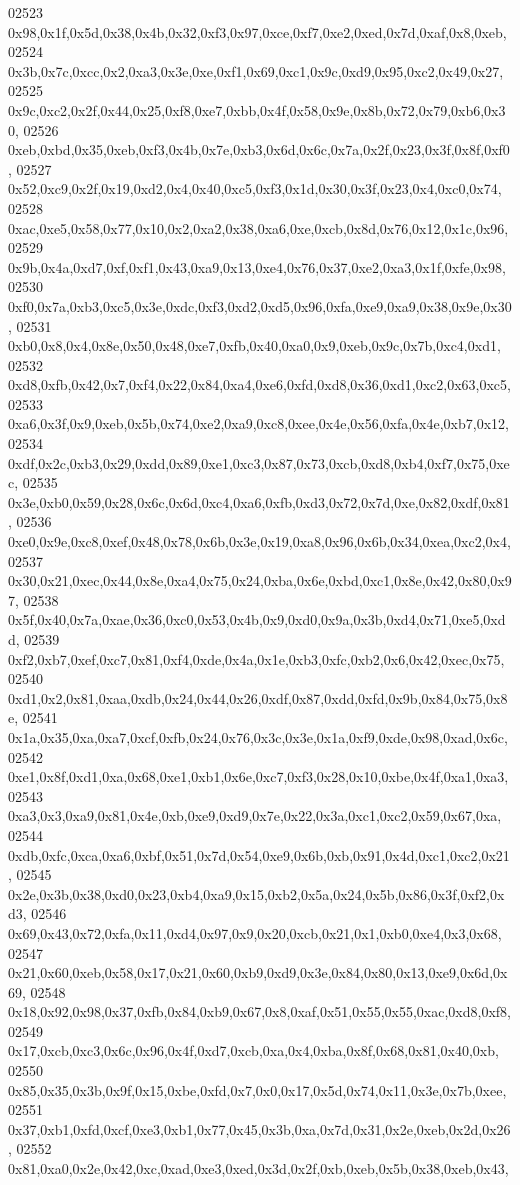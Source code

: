 \begin{DoxyCode}
02523   0x98,0x1f,0x5d,0x38,0x4b,0x32,0xf3,0x97,0xce,0xf7,0xe2,0xed,0x7d,0xaf,0x8,0xeb,
02524   0x3b,0x7c,0xcc,0x2,0xa3,0x3e,0xe,0xf1,0x69,0xc1,0x9c,0xd9,0x95,0xc2,0x49,0x27,
02525   0x9c,0xc2,0x2f,0x44,0x25,0xf8,0xe7,0xbb,0x4f,0x58,0x9e,0x8b,0x72,0x79,0xb6,0x30,
02526   0xeb,0xbd,0x35,0xeb,0xf3,0x4b,0x7e,0xb3,0x6d,0x6c,0x7a,0x2f,0x23,0x3f,0x8f,0xf0,
02527   0x52,0xc9,0x2f,0x19,0xd2,0x4,0x40,0xc5,0xf3,0x1d,0x30,0x3f,0x23,0x4,0xc0,0x74,
02528   0xac,0xe5,0x58,0x77,0x10,0x2,0xa2,0x38,0xa6,0xe,0xcb,0x8d,0x76,0x12,0x1c,0x96,
02529   0x9b,0x4a,0xd7,0xf,0xf1,0x43,0xa9,0x13,0xe4,0x76,0x37,0xe2,0xa3,0x1f,0xfe,0x98,
02530   0xf0,0x7a,0xb3,0xc5,0x3e,0xdc,0xf3,0xd2,0xd5,0x96,0xfa,0xe9,0xa9,0x38,0x9e,0x30,
02531   0xb0,0x8,0x4,0x8e,0x50,0x48,0xe7,0xfb,0x40,0xa0,0x9,0xeb,0x9c,0x7b,0xc4,0xd1,
02532   0xd8,0xfb,0x42,0x7,0xf4,0x22,0x84,0xa4,0xe6,0xfd,0xd8,0x36,0xd1,0xc2,0x63,0xc5,
02533   0xa6,0x3f,0x9,0xeb,0x5b,0x74,0xe2,0xa9,0xc8,0xee,0x4e,0x56,0xfa,0x4e,0xb7,0x12,
02534   0xdf,0x2c,0xb3,0x29,0xdd,0x89,0xe1,0xc3,0x87,0x73,0xcb,0xd8,0xb4,0xf7,0x75,0xec,
02535   0x3e,0xb0,0x59,0x28,0x6c,0x6d,0xc4,0xa6,0xfb,0xd3,0x72,0x7d,0xe,0x82,0xdf,0x81,
02536   0xe0,0x9e,0xc8,0xef,0x48,0x78,0x6b,0x3e,0x19,0xa8,0x96,0x6b,0x34,0xea,0xc2,0x4,
02537   0x30,0x21,0xec,0x44,0x8e,0xa4,0x75,0x24,0xba,0x6e,0xbd,0xc1,0x8e,0x42,0x80,0x97,
02538   0x5f,0x40,0x7a,0xae,0x36,0xc0,0x53,0x4b,0x9,0xd0,0x9a,0x3b,0xd4,0x71,0xe5,0xdd,
02539   0xf2,0xb7,0xef,0xc7,0x81,0xf4,0xde,0x4a,0x1e,0xb3,0xfc,0xb2,0x6,0x42,0xec,0x75,
02540   0xd1,0x2,0x81,0xaa,0xdb,0x24,0x44,0x26,0xdf,0x87,0xdd,0xfd,0x9b,0x84,0x75,0x8e,
02541   0x1a,0x35,0xa,0xa7,0xcf,0xfb,0x24,0x76,0x3c,0x3e,0x1a,0xf9,0xde,0x98,0xad,0x6c,
02542   0xe1,0x8f,0xd1,0xa,0x68,0xe1,0xb1,0x6e,0xc7,0xf3,0x28,0x10,0xbe,0x4f,0xa1,0xa3,
02543   0xa3,0x3,0xa9,0x81,0x4e,0xb,0xe9,0xd9,0x7e,0x22,0x3a,0xc1,0xc2,0x59,0x67,0xa,
02544   0xdb,0xfc,0xca,0xa6,0xbf,0x51,0x7d,0x54,0xe9,0x6b,0xb,0x91,0x4d,0xc1,0xc2,0x21,
02545   0x2e,0x3b,0x38,0xd0,0x23,0xb4,0xa9,0x15,0xb2,0x5a,0x24,0x5b,0x86,0x3f,0xf2,0xd3,
02546   0x69,0x43,0x72,0xfa,0x11,0xd4,0x97,0x9,0x20,0xcb,0x21,0x1,0xb0,0xe4,0x3,0x68,
02547   0x21,0x60,0xeb,0x58,0x17,0x21,0x60,0xb9,0xd9,0x3e,0x84,0x80,0x13,0xe9,0x6d,0x69,
02548   0x18,0x92,0x98,0x37,0xfb,0x84,0xb9,0x67,0x8,0xaf,0x51,0x55,0x55,0xac,0xd8,0xf8,
02549   0x17,0xcb,0xc3,0x6c,0x96,0x4f,0xd7,0xcb,0xa,0x4,0xba,0x8f,0x68,0x81,0x40,0xb,
02550   0x85,0x35,0x3b,0x9f,0x15,0xbe,0xfd,0x7,0x0,0x17,0x5d,0x74,0x11,0x3e,0x7b,0xee,
02551   0x37,0xb1,0xfd,0xcf,0xe3,0xb1,0x77,0x45,0x3b,0xa,0x7d,0x31,0x2e,0xeb,0x2d,0x26,
02552   0x81,0xa0,0x2e,0x42,0xc,0xad,0xe3,0xed,0x3d,0x2f,0xb,0xeb,0x5b,0x38,0xeb,0x43,

\end{DoxyCode}
